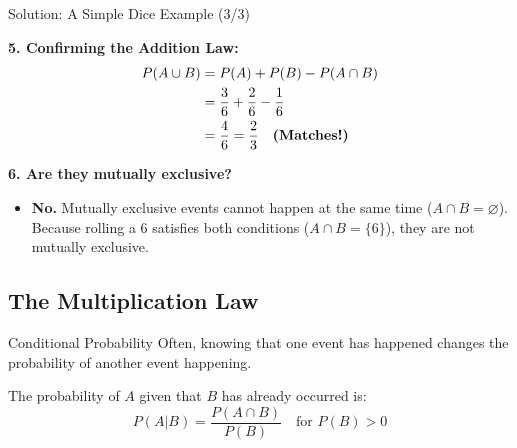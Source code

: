 \begin{frame}{Solution: A Simple Dice Example (3/3)}
    \begin{solution}
        \textbf{5. Confirming the Addition Law:}
        \begin{align*}
            P(A \cup B) &= P(A) + P(B) - P(A \cap B) \\
                        &= \frac{3}{6} + \frac{2}{6} - \frac{1}{6} \\
                        &= \frac{4}{6} = \frac{2}{3} \quad \text{\textbf{(Matches!)}}
        \end{align*}

        \pause \vspace{0.4cm}
        
        \textbf{6. Are they mutually exclusive?}
        \begin{itemize}
            \item \textbf{No.} Mutually exclusive events cannot happen at the same time ($A \cap B = \varnothing$). Because rolling a 6 satisfies both conditions ($A \cap B = \{6\}$), they are not mutually exclusive.
        \end{itemize}
    \end{solution}
\end{frame}


\subsection{The Multiplication Law}

\begin{frame}{Conditional Probability}
    Often, knowing that one event has happened changes the probability of another event happening.

    \begin{definition}
        The probability of $A$ given that $B$ has already occurred is:
        \[ P(A|B) = \frac{P(A \cap B)}{P(B)} \quad \text{for } P(B) > 0 \]
    \end{definition}

\end{frame}

